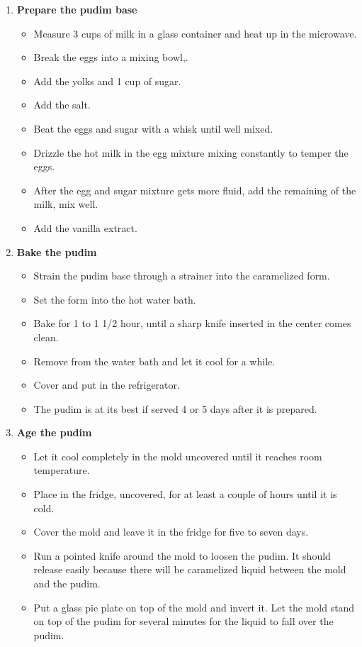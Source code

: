 \documentclass [11pt, letterpaper] {article}
\begin{document}
\begin{description}
\begin{enumerate}
\begin{itemize}
	\end{itemize}
	\item {\bf Prepare the pudim base}
	\begin{itemize}
	\item Measure 3 cups of milk in a glass container and
heat up in the microwave.
	\item Break the eggs into a mixing bowl,.
	\item Add the yolks and 1 cup of sugar.
	\item Add the salt.
        \item Beat the eggs and sugar with a whisk until well mixed.
	\item Drizzle the hot milk in the egg mixture mixing constantly
to temper the eggs.
	\item After the egg and sugar mixture gets more fluid, add the
remaining of the milk, mix well.
	\item Add the vanilla extract.
	\end{itemize}
	\item {\bf Bake the pudim}
	\begin{itemize}
	\item Strain the pudim base through a strainer into the
              caramelized form.
	\item Set the form into the hot water bath.
	\item Bake for 1 to 1 1/2 hour, until a sharp knife inserted in
              the center comes clean.
	\item Remove from the water bath and let it cool for a while.
	\item Cover and put in the refrigerator.
	\item The pudim is at its best if served 4 or 5 days after it
	      is prepared.
	\end{itemize}
	\item {\bf Age the pudim}
	\begin{itemize}
	\item Let it cool completely in the mold uncovered until it reaches room temperature.
	\item Place in the fridge, uncovered, for at least a couple of hours until it is cold.
	\item Cover the mold and leave it in the fridge for five to seven days.
	\item Run a pointed knife around the mold to loosen the pudim. It should release easily because there will be caramelized liquid between the mold and the pudim.
	\item Put a glass pie plate on top of the mold and invert it. Let the mold stand on top of the pudim for several minutes for the liquid to fall over the pudim.

\end{itemize}
\end{enumerate}
\end{description}
\end{document}

